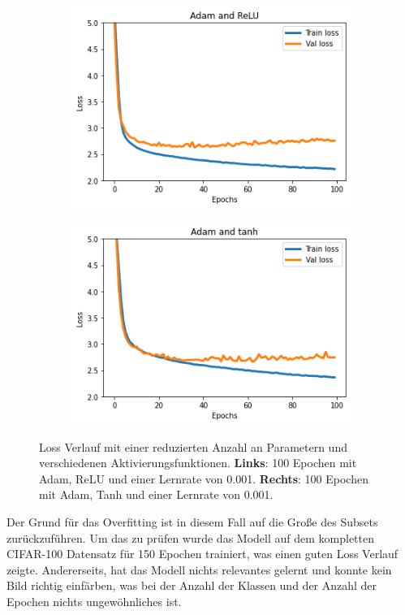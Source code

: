 \begin{figure}[H]
  \centering
  \vspace{1cm}
  \begin{subfigure}
    \centering
    \includegraphics[width=.48\textwidth]{resources/experiments/cifar-adam-relu.png}
  \end{subfigure}
  \begin{subfigure}
    \centering
    \includegraphics[width=.48\textwidth]{resources/experiments/cifar-adam-tanh-100.png}
  \end{subfigure}

  \caption{Loss Verlauf mit einer reduzierten Anzahl an Parametern und verschiedenen Aktivierungsfunktionen. 
  \textbf{Links}: 100 Epochen mit Adam, ReLU und einer Lernrate von 0.001. \textbf{Rechts}: 100 Epochen mit Adam, Tanh und einer Lernrate von 0.001.}
  \label{image:gute-ergebnisse-cifar}
\end{figure}

Der Grund für das Overfitting ist in diesem Fall auf die Große des Subsets zurückzuführen. Um das zu prüfen wurde das Modell auf dem kompletten CIFAR-100
Datensatz für 150 Epochen trainiert, was einen guten Loss Verlauf zeigte. Andererseits, hat das Modell nichts relevantes gelernt und 
konnte kein Bild richtig einfärben, was bei der Anzahl der Klassen und der Anzahl der Epochen nichts ungewöhnliches ist.


